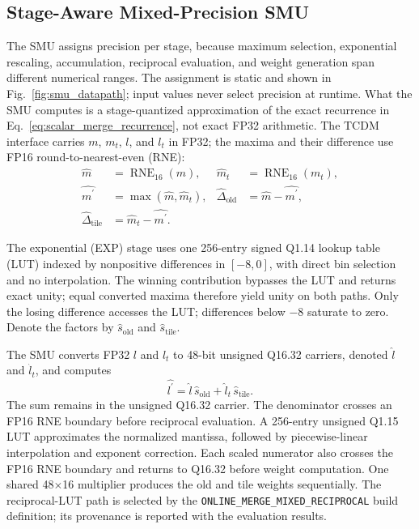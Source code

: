 \documentclass[journal]{IEEEtran}
\begin{document}
\subsection{Stage-Aware Mixed-Precision SMU}
The SMU assigns precision per stage, because maximum selection, exponential
rescaling, accumulation, reciprocal evaluation, and weight generation span
different numerical ranges. The assignment is static and shown in
Fig.~\ref{fig:smu_datapath}; input values never select precision at runtime.
What the SMU computes is a stage-quantized approximation of the exact
recurrence in Eq.~\eqref{eq:scalar_merge_recurrence}, not exact FP32
arithmetic. The TCDM interface carries $m$, $m_t$, $l$, and $l_t$ in FP32; the maxima and their
difference use FP16 round-to-nearest-even (RNE):
\[
\begin{aligned}
\widehat{m} &= \operatorname{RNE}_{16}(m), &
\widehat{m}_t &= \operatorname{RNE}_{16}(m_t),\\
\widehat{m^{\prime}} &= \max(\widehat{m},\widehat{m}_t), &
\widehat{\Delta}_{\mathrm{old}} &= \widehat{m}-\widehat{m^{\prime}},\\
\widehat{\Delta}_{\mathrm{tile}} &= \widehat{m}_t-\widehat{m^{\prime}}.
\end{aligned}
\]

The exponential (EXP) stage uses one 256-entry signed Q1.14 lookup table (LUT)
indexed by nonpositive differences in $[-8,0]$, with direct bin selection and
no interpolation. The winning
contribution bypasses the LUT and returns exact unity; equal converted maxima
therefore yield unity on both paths. Only the losing difference accesses the
LUT; differences below $-8$ saturate to zero. Denote the factors by
$\widehat{s}_{\mathrm{old}}$ and
$\widehat{s}_{\mathrm{tile}}$.

The SMU converts FP32 $l$ and $l_t$ to 48-bit unsigned Q16.32 carriers,
denoted $\widehat{l}$ and $\widehat{l}_t$, and computes
\[
\widehat{l^{\prime}}=\widehat{l}\,\widehat{s}_{\mathrm{old}}
            +\widehat{l}_t\,\widehat{s}_{\mathrm{tile}}.
\]
The sum remains in the unsigned Q16.32 carrier. The denominator crosses an FP16 RNE boundary before reciprocal evaluation. A
256-entry unsigned Q1.15 LUT approximates the normalized mantissa, followed by
piecewise-linear interpolation and exponent correction. Each scaled numerator
also crosses the FP16 RNE boundary and returns to Q16.32 before weight
computation. One shared 48$\times$16 multiplier produces the old and tile
weights sequentially. The reciprocal-LUT path is selected by the
\texttt{ONLINE\_MERGE\_MIXED\_RECIPROCAL} build definition; its provenance is
reported with the evaluation results.
\end{document}

